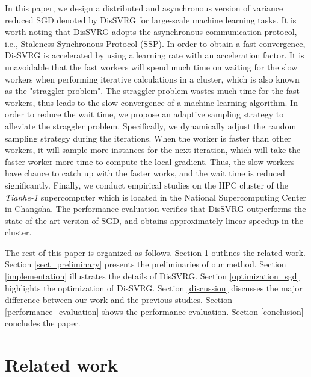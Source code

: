\documentclass[preprint,review,11pt,a4paper]{elsarticle}
\begin{document}
In this paper, we design a distributed and asynchronous version of variance reduced SGD denoted by DisSVRG for large-scale machine learning tasks. It is worth noting that DisSVRG adopts the asynchronous communication protocol, i.e., Staleness Synchronous Protocol (SSP). In order to obtain a fast convergence, DisSVRG is accelerated by using a learning rate with an acceleration factor. It is unavoidable that the fast workers will spend much time on waiting for the slow workers when performing iterative calculations  in a cluster, which is also known as the "straggler problem". The straggler problem wastes much time for the fast workers, thus leads to the slow convergence of a machine learning algorithm. In order to reduce the wait time, we propose an adaptive sampling strategy to alleviate the straggler problem. Specifically, we dynamically adjust the random sampling strategy during the iterations. When the worker is faster than other workers, it will  sample more instances for the next iteration, which will take the faster worker more time to compute the local gradient.   Thus, the slow workers have chance to catch up with the faster works, and  the wait time is reduced significantly. Finally, we conduct empirical studies on the HPC cluster of the \emph{Tianhe-1} supercomputer which is located in the National Supercomputing Center in Changsha. The performance evaluation verifies that DisSVRG outperforms the state-of-the-art version of SGD, and obtains approximately linear speedup in the cluster.


The rest of this paper is organized as follows. Section \ref{related_work} outlines the related work. Section \ref{sect_preliminary} presents the preliminaries of our method. Section \ref{implementation} illustrates the details of DisSVRG. Section \ref{optimization_sgd} highlights the  optimization of DisSVRG. Section \ref{discussion} discusses the major difference between our work and the previous studies. Section \ref{performance_evaluation} shows the performance evaluation. Section \ref{conclusion} concludes the paper.


\section{Related work}
\label{related_work}
\end{document}
